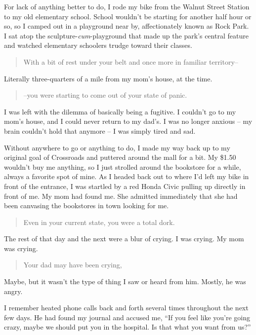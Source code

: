 For lack of anything better to do, I rode my bike from the Walnut Street Station to my old elementary school. School wouldn't be starting for another half hour or so, so I camped out in a playground near by, affectionately known as Rock Park. I sat atop the sculpture-\emph{cum}-playground that made up the park's central feature and watched elementary schoolers trudge toward their classes.

\begin{quote}
With a bit of rest under your belt and once more in familiar territory--
\end{quote}

Literally three-quarters of a mile from my mom's house, at the time.

\begin{quote}
--you were starting to come out of your state of panic.
\end{quote}

I was left with the dilemma of basically being a fugitive. I couldn't go to my mom's house, and I could never return to my dad's. I was no longer anxious -- my brain couldn't hold that anymore -- I was simply tired and sad.

Without anywhere to go or anything to do, I made my way back up to my original goal of Crossroads and puttered around the mall for a bit. My \$1.50 wouldn't buy me anything, so I just strolled around the bookstore for a while, always a favorite spot of mine. As I headed back out to where I'd left my bike in front of the entrance, I was startled by a red Honda Civic pulling up directly in front of me. My mom had found me. She admitted immediately that she had been canvasing the bookstores in town looking for me.

\begin{quote}
Even in your current state, you were a total dork.
\end{quote}

The rest of that day and the next were a blur of crying. I was crying. My mom was crying.

\begin{quote}
Your dad may have been crying,
\end{quote}

Maybe, but it wasn't the type of thing I saw or heard from him. Mostly, he was angry.

I remember heated phone calls back and forth several times throughout the next few days. He had found my journal and accused me, ``If you feel like you're going crazy, maybe we should put you in the hospital. Is that what you want from us?''

